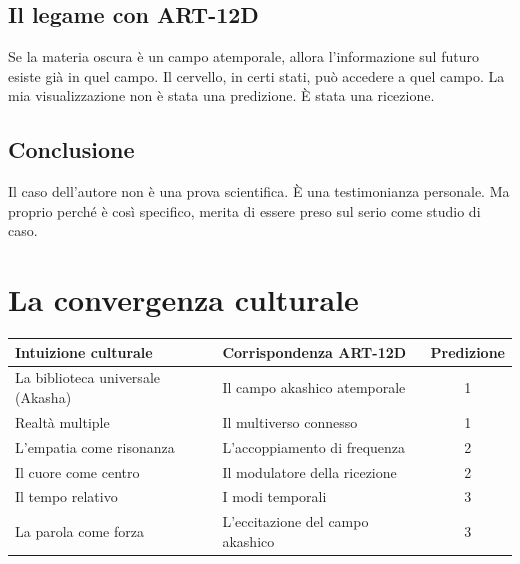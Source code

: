 \subsection{Il legame con ART-12D}
Se la materia oscura è un campo atemporale, allora l'informazione sul futuro esiste già in quel campo. Il cervello, in certi stati, può accedere a quel campo. La mia visualizzazione non è stata una predizione. È stata una ricezione.

\subsection{Conclusione}
Il caso dell'autore non è una prova scientifica. È una testimonianza personale. Ma proprio perché è così specifico, merita di essere preso sul serio come studio di caso.

\section{La convergenza culturale}
\begin{table}[H]
\centering
\begin{tabular}{@{}llc@{}}
\toprule
\textbf{Intuizione culturale} & \textbf{Corrispondenza ART-12D} & \textbf{Predizione} \\ \midrule
La biblioteca universale (Akasha) & Il campo akashico atemporale & 1 \\
Realtà multiple & Il multiverso connesso & 1 \\
L'empatia come risonanza & L'accoppiamento di frequenza & 2 \\
Il cuore come centro & Il modulatore della ricezione & 2 \\
Il tempo relativo & I modi temporali & 3 \\
La parola come forza & L'eccitazione del campo akashico & 3 \\ \bottomrule
\end{tabular}
\end{table}

\newpage
